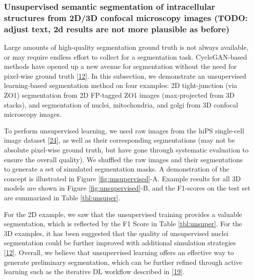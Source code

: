 \hypertarget{unsupervised-semantic-segmentation-of-intracellular-structures-from-2d3d-confocal-microscopy-images-todo-adjust-text-2d-results-are-not-more-plausible-as-before}{%
\subsubsection{Unsupervised semantic segmentation of intracellular structures from 2D/3D confocal microscopy images (TODO: adjust text, 2d results are not more plausible as before)}\label{unsupervised-semantic-segmentation-of-intracellular-structures-from-2d3d-confocal-microscopy-images-todo-adjust-text-2d-results-are-not-more-plausible-as-before}}

Large amounts of high-quality segmentation ground truth is not always available, or may require endless effort to collect for a segmentation task. CycleGAN-based methods have opened up a new avenue for segmentation without the need for pixel-wise ground truth {[}\protect\hyperlink{ref-RuFP3CS3}{12}{]}. In this subsection, we demonstrate an unsupervised learning-based segmentation method on four examples: 2D tight-junction (via ZO1) segmentation from 2D FP-tagged ZO1 images (max-projected from 3D stacks), and segmentation of nuclei, mitochondria, and golgi from 3D confocal microscopy images.

To perform unsupervised learning, we used raw images from the hiPS single-cell image dataset {[}\protect\hyperlink{ref-5sGcmDuy}{24}{]}, as well as their corresponding segmentations (may not be absolute pixel-wise ground truth, but have gone through systematic evaluation to ensure the overall quality). We shuffled the raw images and their segmentations to generate a set of simulated segmentation masks. A demonstration of the concept is illustrated in Figure \ref{fig:unsupervised}-A. Example results for all 3D models are shown in Figure \ref{fig:unsupervised}-B, and the F1-scores on the test set are summarized in Table \ref{tbl:unsuper}.

For the 2D example, we saw that the unsupervised training provides a valuable segmentation, which is reflected by the F1 Score in Table \ref{tbl:unsuper}. For the 3D examples, it has been suggested that the quality of unsupervised nuclei segmentation could be further improved with additional simulation strategies {[}\protect\hyperlink{ref-RuFP3CS3}{12}{]}. Overall, we believe that unsupervised learning offers an effective way to generate preliminary segmentation, which can be further refined through active learning such as the iterative DL workflow described in {[}\protect\hyperlink{ref-jM3v1UjQ}{19}{]}.

